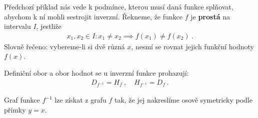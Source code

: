 Předchozí příklad nás vede k podmínce, kterou musí daná funkce splňovat, abychom k ní mohli sestrojit inverzní. Řekneme, že funkce $f$ je \textbf{prostá} na intervalu $I$, jestliže \begin{align}
    x_1, x_2 \in I : x_1 \neq x_2 \implies f(x_1) \neq f(x_2) \:.
\end{align}
Slovně řečeno: vybereme-li si dvě různá $x$, nesmí se rovnat jejich funkční hodnoty $f(x)$.

Definiční obor a obor hodnot se u inverzní funkce prohazují: \begin{align}
    D_{f^{-1}} = H_f \:, \quad H_{f^{-1}} = D_f \:.
\end{align}

Graf funkce $f^{-1}$ lze získat z grafu $f$ tak, že jej nakreslíme osově symetricky podle přímky $y=x$.


